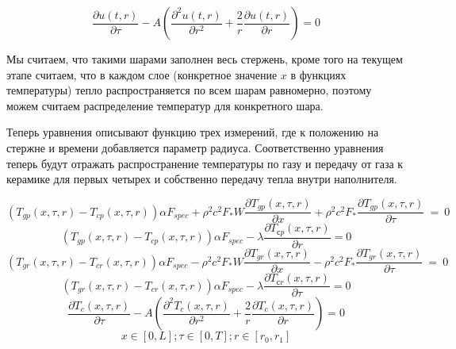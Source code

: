 \documentclass[a4paper,12pt]{article}
\begin{document}
$$\frac{\partial u(t,r)}{\partial \tau} - A\left(\frac{\partial^2 u(t,r)}{\partial r^2} + \frac{2}{r} \frac{\partial u(t,r)}{\partial r}\right) = 0$$

Мы считаем, что такими шарами заполнен весь стержень, кроме того на
текущем этапе считаем, что в каждом слое (конкретное значение $x$ в
функциях температуры) тепло распространяется по всем шарам равномерно,
поэтому можем считаем распределение температур для конкретного шара.

Теперь уравнения описывают функцию трех измерений, где к положению на
стержне и времени добавляется параметр радиуса. Соответственно
уравнения теперь будут отражать распространение температуры по газу и
передачу от газа к керамике для первых четырех и собственно передачу
тепла внутри наполнителя.

 $$(T_{gp}(x,\tau,r) - T_{cp}(x,\tau,r)) \alpha F_{spec} + \rho^2 c^2 F_* W\frac{\partial T_{gp}(x,\tau,r)}{\partial x} + \rho^2 c^2 F_*\frac{\partial T_{gp}(x,\tau,r)}{\partial \tau}~=~0$$
$$(T_{gp}(x,\tau,r) - T_{cp}(x,\tau,r))\alpha F_{spec} - \lambda \frac{\partial T_{сp}(x,\tau,r)}{\partial r} = 0$$
$$(T_{gr}(x,\tau,r) - T_{cr}(x,\tau,r)) \alpha F_{spec} - \rho^2 c^2 F_* W\frac{\partial T_{gr}(x,\tau,r)}{\partial x} - \rho^2 c^2 F_*\frac{\partial T_{gr}(x,\tau,r)}{\partial \tau}~=~0$$
$$(T_{gr}(x,\tau,r) - T_{cr}(x,\tau,r))\alpha F_{spec} -  \lambda \frac{\partial T_{сr}(x,\tau,r)}{\partial \tau} = 0$$
$$\frac{\partial T_{c}(x,\tau,r)}{\partial \tau} - A\left(\frac{\partial^2 T_{c}(x,\tau,r)}{\partial r^2} + \frac{2}{r} \frac{\partial T_{c}(x,\tau,r)}{\partial r}\right) = 0$$
$$x \in [0, L]; \tau \in [0, T]; r \in [r_0,r_1]$$
 
  
  
\end{document}
